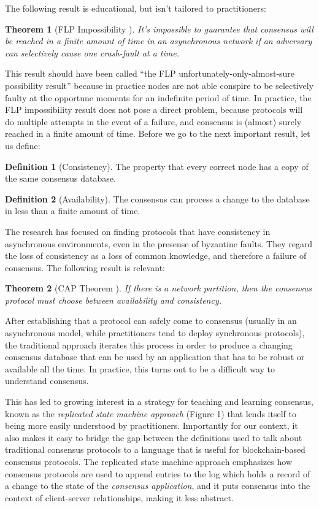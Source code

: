 \documentclass[11pt,a4paper]{article}
\theoremstyle{plain}
\newtheorem{thm}{Theorem}
\theoremstyle{definition}
\newtheorem{defn}{Definition}
\begin{document}
The following result is educational, but isn't tailored to practitioners:

\begin{thm}[FLP Impossibility \cite{FLP}]
It's impossible to guarantee that consensus will be reached in a finite amount of time in an asynchronous network if an adversary can selectively cause one crash-fault at a time.
\end{thm}

This result should have been called ``the FLP unfortunately-only-almost-sure possibility result'' because in practice nodes are not able conspire to be selectively faulty at the opportune moments for an indefinite period of time. In practice, the FLP impossibility result does not pose a direct problem, because protocols will do multiple attempts in the event of a failure, and consensus is (almost) surely reached in a finite amount of time. Before we go to the next important result, let us define:

\begin{defn}[Consistency]
The property that every correct node has a copy of the same consensus database.
\end{defn}

\begin{defn}[Availability]
The consensus can process a change to the database in less than a finite amount of time.
\end{defn}

The research has focused on finding protocols that have consistency in asynchronous environments, even in the presense of byzantine faults. They regard the loss of consistency as a loss of common knowledge, and therefore a failure of consensus. The following result is relevant:

\begin{thm}[CAP Theorem \cite{CAP}]
If there is a network partition, then the consensus protocol must choose between availability and consistency.
\end{thm}

After establishing that a protocol can safely come to consensus (usually in an asynchronous model, while practitioners tend to deploy synchronous protocols), the traditional approach iterates this process in order to produce a changing consensus database that can be used by an application that has to be robust or available all the time. In practice, this turns out to be a difficult way to understand consensus.

This has led to growing interest in a strategy for teaching and learning consensus, known as the \emph{replicated state machine approach} (Figure 1) that lends itself to being more easily understood by practitioners. Importantly for our context, it also makes it easy to bridge the gap between the definitions used to talk about traditional consensus protocols to a language that is useful for blockchain-based consensus protocols. The replicated state machine approach emphasizes how consensus protocols are used to append entries to the log which holds a record of a change to the state of the \emph{consensus application}, and it puts consensus into the context of client-server relationships, making it less abstract.
\end{document}
